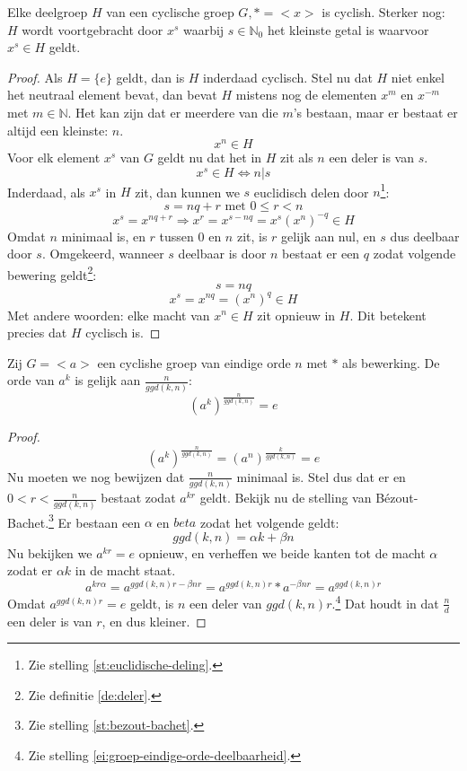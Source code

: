 \documentclass[main.tex]{subfiles}
\begin{document}
\begin{st}
  \label{st:deelgroep-van-cyclische-groep-is-cyclisch}
  Elke deelgroep $H$ van een cyclische groep $G,* = <x>$ is cyclish.
  Sterker nog: $H$ wordt voortgebracht door $x^{s}$ waarbij $s \in \mathbb{N}_{0 }$ het kleinste getal is waarvoor $x^{s} \in H$ geldt. 

  \begin{proof}
    Als $H = \{e\}$ geldt, dan is $H$ inderdaad cyclisch.
    Stel nu dat $H$ niet enkel het neutraal element bevat, dan bevat $H$ mistens nog de elementen $x^{m}$ en $x^{-m}$ met $m \in \mathbb{N}$.
    Het kan zijn dat er meerdere van die $m$'s bestaan, maar er bestaat er altijd een kleinste: $n$.
    \[ x^{n} \in H \]
    Voor elk element $x^{s}$ van $G$ geldt nu dat het in $H$ zit als $n$ een deler is van $s$.
    \[ x^{s} \in H \Leftrightarrow n|s \]
    Inderdaad, als $x^{s}$ in $H$ zit, dan kunnen we $s$ euclidisch delen door $n$\footnote{Zie stelling \ref{st:euclidische-deling}.}:
    \[ s = nq + r \text{ met } 0 \le r < n \]
    \[ x^{s} = x^{nq + r} \Rightarrow x^{r} = x^{s-nq} = x^{s}(x^{n})^{-q} \in H \]
    Omdat $n$ minimaal is, en $r$ tussen $0$ en $n$ zit, is $r$ gelijk aan nul, en $s$ dus deelbaar door $s$.
    Omgekeerd, wanneer $s$ deelbaar is door $n$ bestaat er een $q$ zodat volgende bewering geldt\footnote{Zie definitie \ref{de:deler}.}:
    \[ s = nq \]
    \[ x^{s} = x^{nq} = (x^{n})^{q} \in H \]
    Met andere woorden: elke macht van $x^{n} \in H$ zit opnieuw in $H$. Dit betekent precies dat $H$ cyclisch is.
  \end{proof}
\end{st}

\begin{st}
  \label{st:orde-element-cyclische-groep}
  Zij $G = <a>$ een cyclishe groep van eindige orde $n$ met $*$ als bewerking.
  De orde van $a^{k}$ is gelijk aan $\frac{n}{ggd(k,n)}$:
  \[ (a^{k})^{\frac{n}{ggd(k,n)}} = e\]
  
  \begin{proof}
    \[ (a^{k})^{\frac{n}{ggd(k,n)}} = (a^{n})^{\frac{k}{ggd(k,n)}} = e \]
    Nu moeten we nog bewijzen dat $\frac{n}{ggd(k,n)}$ minimaal is.
    Stel dus dat er en $0 < r < \frac{n}{ggd(k,n)}$ bestaat zodat $a^{kr}$ geldt.
    Bekijk nu de stelling van B\'ezout-Bachet.\footnote{Zie stelling \ref{st:bezout-bachet}.}
    Er bestaan een $\alpha$ en $beta$ zodat het volgende geldt:
    \[ ggd(k,n) = \alpha k + \beta n \]
    Nu bekijken we $a^{kr} = e$ opnieuw, en verheffen we beide kanten tot de macht $\alpha$ zodat er $\alpha k$ in de macht staat.
    \[ a^{kr\alpha} = a^{ggd(k,n)r - \beta nr} = a^{ggd(k,n)r}* a^{-\beta nr} = a^{ggd(k,n)r}\]
    Omdat $a^{ggd(k,n)r} = e$ geldt, is $n$ een deler van $ggd(k,n)r$.\footnote{Zie stelling \ref{ei:groep-eindige-orde-deelbaarheid}.}
    Dat houdt in dat $\frac{n}{d}$ een deler is van $r$, en dus kleiner.
  \end{proof}

\end{st}
\end{document}
